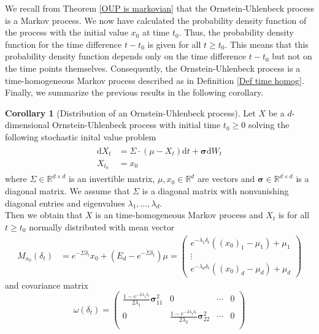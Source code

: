 \documentclass[11pt,titlepage]{article}
\newcommand{\R}{\mathbb{R}} %
\theoremstyle{definition}
\newtheorem{corollary}[theorem]{Corollary}
\theoremstyle{remark}
\begin{document}
	We recall from Theorem \ref{OUP is markovian} that the Ornstein-Uhlenbeck process is a Markov process. We now have calculated the probability density function of the process with the initial value $x_0$ at time $t_0$. Thus, the probability density function for the time difference $t-t_0$ is given for all $t\geq t_0$. This means that this probability density function depends only on the time difference $t-t_0$ but not on the time points themselves. Consequently, the Ornstein-Uhlenbeck process is a time-homogeneous Markov process described as in Definition \ref{Def time homog}.\\	
	Finally, we summarize the previous results in the following corollary.
	\newpage
	\begin{corollary}[Distribution of an Ornstein-Uhlenbeck process]\label{coroll OUP Eigenschaften}
		Let $X$ be a $d$-dimensional Ornstein-Uhlenbeck process with initial time $t_0\geq 0$ solving the following stochastic inital value problem
		\begin{align*}
			\begin{split}
				\mathrm{d}X_t &= \Sigma\cdot (\mu-X_t)\mathrm{d}t +\boldsymbol{\sigma} \mathrm{d}W_t\\
				X_{t_0}&=x_0
			\end{split}
		\end{align*}
		where $\Sigma\in\R^{d\times d}$ is an invertible matrix, $\mu,x_0\in\R^d$ are vectors and $\boldsymbol{\sigma}\in\R^{d\times d}$ is a diagonal matrix. We assume that $\Sigma$ is a diagonal matrix with nonvanishing diagonal entries and eigenvalues $\lambda_1,\ldots,\lambda_d$. \\
		Then we obtain that $X$ is an time-homogeneous Markov process and $X_t$ is for all $t\geq t_0$ normally distributed with mean vector
		\begin{align*}
			M_{x_0}(\delta_t) &= e^{-\Sigma \delta_t}x_0 +(E_d-e^{-\Sigma \delta_t})\mu
			= \begin{pmatrix}
				e^{-\lambda_1 \delta_t} ((x_0)_1 - \mu_1) + \mu_1 \\
				\vdots \\
				e^{-\lambda_d \delta_t} ((x_0)_d - \mu_d) + \mu_d
			\end{pmatrix}
		\end{align*}
		and covariance matrix
		\[\omega(\delta_t) = \begin{pmatrix}
			\frac{1- e^{-2\lambda_1 \delta_t}}{2\lambda_1} \boldsymbol{\sigma}_{11}^2  & 0 &\cdots & 0 \\
			0 & \frac{1- e^{-2\lambda_2 \delta_t}}{2\lambda_2} \boldsymbol{\sigma}_{22}^2  & \cdots & 0 \\

\end{pmatrix}\]
\end{corollary}
\end{document}
